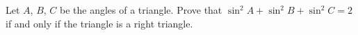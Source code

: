 Let $A$, $B$, $C$ be the angles of a triangle. Prove that $\sin^2A+\sin^2B+\sin^2C=2$ if and only if the triangle is a right triangle.
